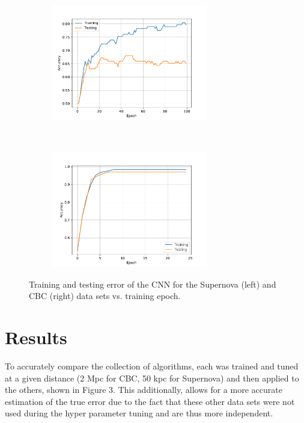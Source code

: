 \documentclass{article}
\begin{document}
\begin{figure}[h!]
    \centering
    \begin{subfigure}[t]{0.5\textwidth}
        \centering
        \includegraphics[height=2in]{NNTrainingSN.pdf}
    \end{subfigure}%
    ~ 
    \begin{subfigure}[t]{0.5\textwidth}
        \centering
        \includegraphics[height=2in]{NNTrainingCBC.pdf}
    \end{subfigure}
    \caption{Training and testing error of the CNN for the Supernova (left) and CBC (right) data sets vs. training epoch.}
\end{figure}

\section{Results}

To accurately compare the collection of algorithms, each was trained and tuned at a given distance (2 Mpc for CBC, 50 kpc for Supernova) and then applied to the others, shown in Figure 3. This additionally, allows for a more accurate estimation of the true error due to the fact that these other data sets were not used during the hyper parameter tuning and are thus more independent.
\end{document}
